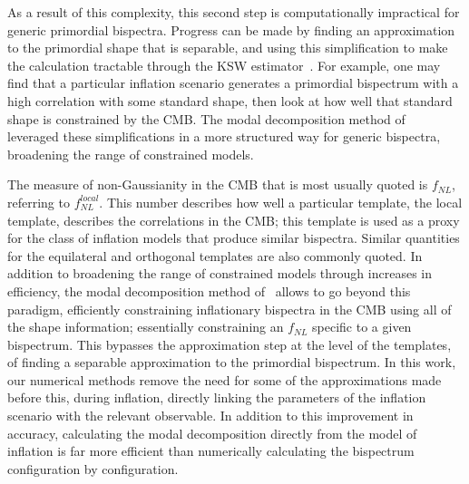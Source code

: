 \documentclass[a4paper,12pt]{extarticle}
\newcommand{\fnl}{f_{NL}}
\newcommand{\fnllocal}{f^{local}_{NL}}
\begin{document}
As a result of this complexity, this second step is computationally impractical for generic primordial bispectra.
Progress can be made by finding an approximation to the primordial shape
that is separable, and using this simplification
to make the calculation tractable
through the KSW estimator~\cite{Komatsu_2005, Munchmeyer_2014}.
For example, one may find that a particular inflation scenario generates
a primordial bispectrum with a high correlation with some standard shape,
then look at how well that standard shape is constrained by the CMB.
The modal decomposition method of~\cite{FergShell_1,FergShell_2,FergShell_3}
leveraged these simplifications in a more structured way
for generic bispectra, broadening the range of constrained models.


The measure of non-Gaussianity in the CMB that is
most usually quoted is $\fnl$, referring to $\fnllocal$.
This number describes how well a particular template, the local template,
describes the correlations in the CMB;
this template is used as a proxy for the class of inflation models that produce similar bispectra.
Similar quantities for the equilateral and orthogonal templates are also
commonly quoted.
In addition to broadening the range of constrained models through increases in efficiency,
the modal decomposition method of~\cite{FergShell_1,FergShell_2,FergShell_3}
allows to go beyond this paradigm, efficiently constraining inflationary bispectra in the CMB using
all of the shape information; essentially constraining an $\fnl$
specific to a given bispectrum. This bypasses the approximation step at the level of the templates,
of finding a separable approximation to the primordial bispectrum.
In this work, our numerical methods remove the need for some of the approximations
made before this, during inflation, directly linking the parameters of the inflation scenario
with the relevant observable.
In addition to this improvement in accuracy, calculating the modal decomposition
directly from the model of inflation is far more efficient 
than numerically calculating the bispectrum configuration by configuration.
\end{document}
